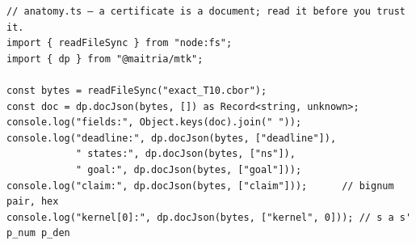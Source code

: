 \begin{Verbatim}[fontsize=\small,frame=leftline,rulecolor=\color{accentmid},framesep=3mm,xleftmargin=3mm]
// anatomy.ts — a certificate is a document; read it before you trust it.
import { readFileSync } from "node:fs";
import { dp } from "@maitria/mtk";

const bytes = readFileSync("exact_T10.cbor");
const doc = dp.docJson(bytes, []) as Record<string, unknown>;
console.log("fields:", Object.keys(doc).join(" "));
console.log("deadline:", dp.docJson(bytes, ["deadline"]),
            " states:", dp.docJson(bytes, ["ns"]),
            " goal:", dp.docJson(bytes, ["goal"]));
console.log("claim:", dp.docJson(bytes, ["claim"]));      // bignum pair, hex
console.log("kernel[0]:", dp.docJson(bytes, ["kernel", 0])); // s a s' p_num p_den
\end{Verbatim}
